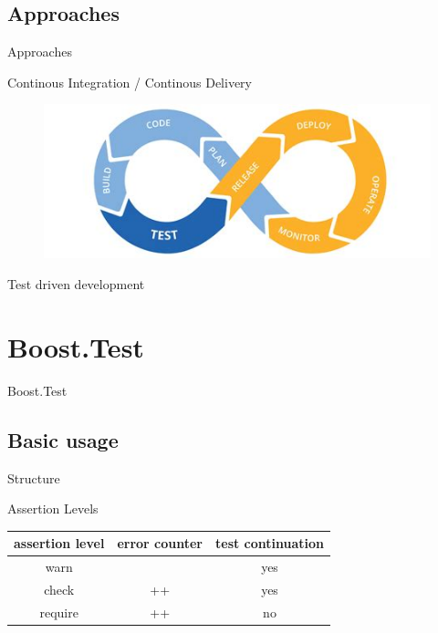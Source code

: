 \documentclass{beamer}
\newcommand{\sectiontitle}[1]{
    \section{#1}
    \begin{frame}
        \centering
        \LARGE{#1}
    \end{frame}
}
\newcommand{\subsectiontitle}[1]{
    \subsection{#1}
    \begin{frame}
        \LARGE{#1}
    \end{frame}
}
\begin{document}
        \subsectiontitle{Approaches}
        \begin{frame}{Continous Integration / Continous Delivery}
            \centering
            \begin{figure}
                \includegraphics[width=12cm]{./images/cicd.jpeg}
            \end{figure}
        \end{frame}
        \begin{frame}{Test driven development}
            \centering
        \end{frame}


    \sectiontitle{Boost.Test}

        \subsection{Basic usage}
        \begin{frame}{Structure}
            
        \end{frame}

        \begin{frame}{Assertion Levels}
            \begin{tabular}{c|c|c}
                assertion level &   error counter   &   test continuation   \\
                \hline
                warn    &       &   yes  \\
                check   &   ++  &   yes \\
                require &   ++  &   no  \\
            \end{tabular}
        \end{frame}
\end{document}

